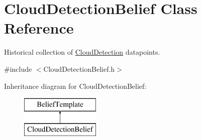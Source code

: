 \hypertarget{class_cloud_detection_belief}{
\section{CloudDetectionBelief Class Reference}
\label{class_cloud_detection_belief}
}


Historical collection of \hyperlink{class_cloud_detection}{CloudDetection} datapoints.  




{\ttfamily \#include $<$CloudDetectionBelief.h$>$}

Inheritance diagram for CloudDetectionBelief:\begin{figure}[H]
\begin{center}
\leavevmode
\includegraphics[height=2.000000cm]{class_cloud_detection_belief}
\end{center}
\end{figure}
